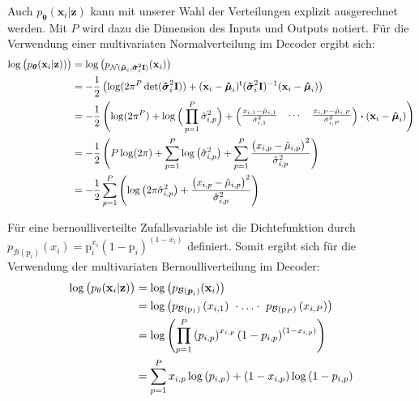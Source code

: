 \documentclass[12pt]{article}
\newcommand{\pdec}{p_{\boldsymbol\theta}(\mathbf{x}_i|\mathbf{z})}
\begin{document}
	Auch $\pdec$ kann mit unserer Wahl der Verteilungen explizit ausgerechnet werden.
	Mit $P$ wird dazu die Dimension des Inputs und Outputs notiert.
	Für die Verwendung einer multivariaten Normalverteilung im Decoder ergibt sich:
	\begin{align*}
	\log\big(\pdec)\big) &=  \log\big(p_{\mathcal{N}(\boldsymbol{\hat{\mu}}_{i},\boldsymbol{\hat{\sigma}}_{i}^{2}\textbf{I})}(\textbf{x}_{i})\big)\notag \\
	&= -\frac{1}{2}\left(\log(2\pi^{P} \det(\boldsymbol{\hat{\sigma}}_{i}^{2}\textbf{I}))+(\textbf{x}_{i}-\boldsymbol{\hat{\mu}}_{i})^{\mathsf{t}}(\boldsymbol{\hat{\sigma}}_{i}^{2}\textbf{I})^{-1}(\textbf{x}_{i}-\boldsymbol{\hat{\mu}}_{i})\right) \notag \\
	&= -\frac{1}{2}\left(\log(2\pi^{P})+\log\Big( \prod_{p=1}^{P}\hat{\sigma}_{i,p}^{2}\Big)+  \begin{pmatrix}  \frac{x_{i,1}-\hat{\mu}_{i,1}}{\hat{\sigma}_{i,1}^{2}}&\cdots& \frac{x_{i,P}-\hat{\mu}_{i,P}}{\hat{\sigma}_{i,P}^{2}}\end{pmatrix}
	\boldsymbol{\cdot}(\textbf{x}_{i}-\boldsymbol{\hat{\mu}}_{i})\right) \notag \\
	&= -\frac{1}{2}\left(P\log(2\pi)+\sum_{p=1}^{P}\log\left( \hat{\sigma}_{i,p}^{2}\right)+
	\sum_{p=1}^{P}\frac{\big(x_{i,p}-\hat{\mu}_{i,p}\big)^{2}}{\hat{\sigma}_{i,p}^{2}}\right) \notag \\
	&= -\frac{1}{2}\sum_{p=1}^{P} \left(\log\left(2\pi \hat{\sigma}_{i,p}^{2}\right) + \frac{\big(x_{i,p}-\hat{\mu}_{i,p}\big)^{2}}{\hat{\sigma}_{i,p}^{2}}\right)
	\end{align*}

	Für eine bernoulliverteilte Zufallsvariable ist die Dichtefunktion  durch $p_{\mathcal{B}(\mathrm{p}_{i})}(x_{i}) = \mathrm{p}_{i}^{x_{i}}(1-\mathrm{p}_{i})^{(1-x_{i})}$ definiert. Somit ergibt sich für die Verwendung der multivariaten Bernoulliverteilung im Decoder: \\
	\begin{align*}
	\log\big(p_{\theta}(\textbf{x}_{i}|\textbf{z})\big) &=  \log\big(p_{\mathcal{B}(\boldsymbol{p}_{i})}(\textbf{x}_{i})\big)\notag \\
	&= \log\left(p_{\mathcal{B}(\mathrm{p}_{1})}\left(x_{i,1}\right)\ \cdot\ldots\cdot \ p_{\mathcal{B}(\mathrm{p}_{P})}\left(x_{i,P}\right)\right)\notag \\
	&= \log\left(\prod_{p=1}^{P}\left(p_{i,p}\right)^{x_{i,p}}\left(1-p_{i,p}\right)^{\left(1-x_{i,p}\right)}\right) \notag \\
	&=  \sum_{p=1}^{P}x_{i,p}\log\left(p_{i,p}\right)+\left(1-x_{i,p}\right)\log\left(1-p_{i,p}\right)
	\end{align*}
\end{document}
